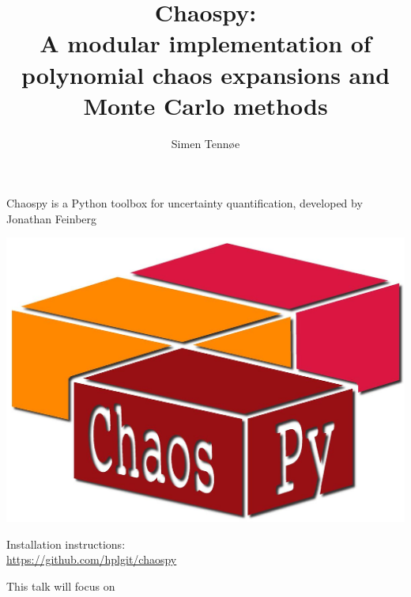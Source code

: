 \documentclass[handout]{beamer}
\title{Chaospy: \\ A modular implementation of polynomial chaos expansions and Monte Carlo methods}
\author{Simen Tennøe}
\institute{University of Oslo, IFI\\ Simula}
\begin{document}
\begin{frame}
  \maketitle
\end{frame}


\begin{frame}[fragile]{Chaospy is a Python toolbox for uncertainty quantification, developed by Jonathan Feinberg}
  \begin{center}
     \includegraphics[width=.7\textwidth]{chaospy_logo.jpg}
  \end{center}
  \begin{alert}{Installation instructions:}\\
  \scriptsize
      \href{https://github.com/hplgit/chaospy}{https://github.com/hplgit/chaospy}\\
  \end{alert}
\end{frame}


\begin{frame}[fragile]{This talk will focus on}
  
\end{frame}
\end{document}
